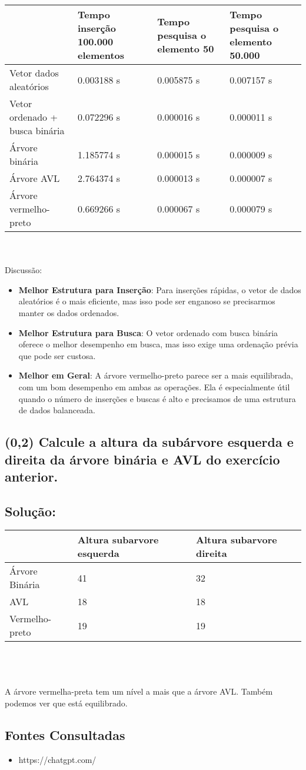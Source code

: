 \documentclass{article}
\begin{document}
\begin{tabularx}{\textwidth}{|X|X|X|X|} 
  \hline
   & 
   Tempo inserção 100.000 elementos & 
   Tempo pesquisa o elemento 50 & 
   Tempo pesquisa o elemento 50.000 \\ 
  \hline
  Vetor dados aleatórios & 0.003188 s  & 0.005875 s  & 0.007157 s  \\ \hline
  Vetor ordenado + busca binária & 0.072296 s  & 0.000016 s  & 0.000011 s  \\ \hline
  Árvore binária & 1.185774 s  & 0.000015 s  & 0.000009 s  \\ \hline
  Árvore AVL & 2.764374 s  & 0.000013 s  & 0.000007 s  \\ \hline
  Árvore vermelho-preto & 0.669266 s  & 0.000067 s  & 0.000079 s  \\ \hline
\end{tabularx}
\\
\\Discussão:
\begin{itemize}
  \item \textbf{Melhor Estrutura para Inserção}: Para inserções rápidas, o vetor de dados aleatórios é o mais eficiente, mas isso pode ser enganoso se precisarmos manter os dados ordenados.

  \item \textbf{Melhor Estrutura para Busca}: O vetor ordenado com busca binária oferece o melhor desempenho em busca, mas isso exige uma ordenação prévia que pode ser custosa.
  
  \item \textbf{Melhor em Geral}: A árvore vermelho-preto parece ser a mais equilibrada, com um bom desempenho em ambas as operações. Ela é especialmente útil quando o número de inserções e buscas é alto e precisamos de uma estrutura de dados balanceada.
  
\end{itemize}


\subsection {(0,2) Calcule a altura da subárvore esquerda e direita da árvore binária e AVL do
exercício anterior.}

\subsection*{Solução:}

\begin{tabularx}{\textwidth}{|X|X|X|} %
  \hline
   & Altura subarvore esquerda & Altura subarvore direita \\ \hline
   Árvore Binária & 41 & 32 \\ \hline
   AVL & 18 & 18 \\ \hline
   Vermelho-preto & 19 & 19 \\ \hline
\end{tabularx}
\\
\\
\\
A árvore vermelha-preta tem um nível a mais que a árvore AVL. Também podemos ver que está equilibrado.
\subsection*{Fontes Consultadas}
\begin{itemize}
    \item https://chatgpt.com/
\end{itemize}
\end{document}
